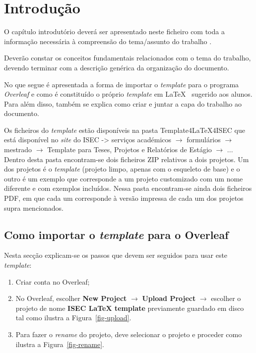 
\chapter{Introdução}

O capítulo introdutório deverá ser apresentado neste ficheiro com toda a informação necessária à compreensão do tema/assunto do trabalho \cite{CitekeyMastersthesis}\cite{CitekeyBook}. 

Deverão constar os conceitos fundamentais relacionados com o tema do  trabalho, devendo terminar com a descrição genérica da organização do documento.

No que segue é apresentada a forma de importar o \textit{template} para o programa \textit{Overleaf} e como é constituído o próprio \textit{template}  em \LaTeX~ sugerido aos alunos. Para além disso, também se explica como criar e juntar a capa do trabalho ao documento.

Os ficheiros do \textit{template} estão disponíveis na pasta Template4LaTeX4ISEC que está disponível no \textit{site} do ISEC -> serviços académicos $\rightarrow$ formulários $\rightarrow$ mestrado $\rightarrow$ Template para Teses, Projetos e Relatórios de Estágio $\rightarrow$ ... \\
Dentro desta pasta encontram-se dois ficheiros ZIP relativos a dois projetos. Um dos projetos é o \textit{template} (projeto limpo, apenas com o esqueleto de base) e o outro é um  exemplo que corresponde a um projeto customizado com um nome diferente e com exemplos incluídos. Nessa pasta encontram-se ainda dois ficheiros PDF, em que cada um corresponde à versão impressa de cada um dos projetos supra mencionados.

\section{Como importar o \textit{template} para o Overleaf}
    Nesta secção explicam-se os passos que devem ser seguidos para usar este \textit{template}:
    \begin{enumerate}
        \item Criar conta no Overleaf;
        \item No Overleaf, escolher \textbf{New Project} $\rightarrow$ \textbf{Upload Project} $\rightarrow$ escolher o projeto de nome \textbf{ISEC LaTeX template} previamente guardado em disco tal como ilustra a  Figura~\ref{fig-upload}.
        \item Para fazer o \textit{rename} do projeto, deve selecionar o projeto e proceder como ilustra a Figura~\ref{fig-rename}.%
    \end{enumerate}
    
